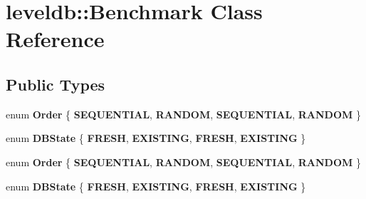 \hypertarget{classleveldb_1_1_benchmark}{}\section{leveldb\+::Benchmark Class Reference}
\label{classleveldb_1_1_benchmark}
\subsection*{Public Types}
\begin{DoxyCompactItemize}
\item 
\mbox{\label{classleveldb_1_1_benchmark_a4694fe0f2fd06d7da386305a339ddbc4}} 
enum {\bfseries Order} \{ {\bfseries S\+E\+Q\+U\+E\+N\+T\+I\+AL}, 
{\bfseries R\+A\+N\+D\+OM}, 
{\bfseries S\+E\+Q\+U\+E\+N\+T\+I\+AL}, 
{\bfseries R\+A\+N\+D\+OM}
 \}
\item 
\mbox{\label{classleveldb_1_1_benchmark_ad94bd817d74359a4d8cea6da609a28d4}} 
enum {\bfseries D\+B\+State} \{ {\bfseries F\+R\+E\+SH}, 
{\bfseries E\+X\+I\+S\+T\+I\+NG}, 
{\bfseries F\+R\+E\+SH}, 
{\bfseries E\+X\+I\+S\+T\+I\+NG}
 \}
\item 
\mbox{\label{classleveldb_1_1_benchmark_a4694fe0f2fd06d7da386305a339ddbc4}} 
enum {\bfseries Order} \{ {\bfseries S\+E\+Q\+U\+E\+N\+T\+I\+AL}, 
{\bfseries R\+A\+N\+D\+OM}, 
{\bfseries S\+E\+Q\+U\+E\+N\+T\+I\+AL}, 
{\bfseries R\+A\+N\+D\+OM}
 \}
\item 
\mbox{\label{classleveldb_1_1_benchmark_ad94bd817d74359a4d8cea6da609a28d4}} 
enum {\bfseries D\+B\+State} \{ {\bfseries F\+R\+E\+SH}, 
{\bfseries E\+X\+I\+S\+T\+I\+NG}, 
{\bfseries F\+R\+E\+SH}, 
{\bfseries E\+X\+I\+S\+T\+I\+NG}
 \}
\end{DoxyCompactItemize}
